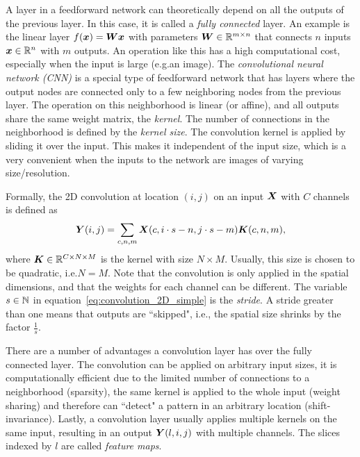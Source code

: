 		A layer in a feedforward network can theoretically depend on all the outputs of the previous layer.
		In this case, it is called a \emph{fully connected} layer.
		An example is the linear layer $f(\bm{x}) = \bm{W} \bm{x}$ with parameters $\bm{W} \in \mathbb{R}^{m \times n}$ that connects $n$ inputs $\bm{x} \in \mathbb{R}^n$ with $m$ outputs.
		An operation like this has a high computational cost, especially when the input is large (e.g.\@ an image).
		The \emph{convolutional neural network (CNN)} is a special type of feedforward network that has layers where the output nodes are connected only to a few neighboring nodes from the previous layer.
		The operation on this neighborhood is linear (or affine), and all outputs share the same weight matrix, the \emph{kernel}.
		The number of connections in the neighborhood is defined by the \emph{kernel size}.
		The convolution kernel is applied by sliding it over the input.
		This makes it independent of the input size, which is a very convenient when the inputs to the network are images of varying size/resolution.
		
		Formally, the 2D convolution at location $(i, j)$ on an input $\bm{X}$ with $C$ channels is defined as 
		\begin{equation}\label{eq:convolution_2D_simple}
			\bm{Y}(i, j) = 
			\sum_{c, n, m}
				\bm{X}(c, i \cdot s - n, j \cdot s - m) \bm{K}(c, n, m), 
		\end{equation}
		where $\bm{K} \in \mathbb{R}^{C \times N \times M}$ is the kernel with size $N \times M$.
		Usually, this size is chosen to be quadratic, i.e.\@ $N = M$.
		Note that the convolution is only applied in the spatial dimensions, and that the weights for each channel can be different.
		The variable $s \in \mathbb{N}$ in equation~\ref{eq:convolution_2D_simple} is the \emph{stride}.
		A stride greater than one means that outputs are ``skipped", i.e., the spatial size shrinks by the factor $\frac{1}{s}$.
		
		There are a number of advantages a convolution layer has over the fully connected layer.
		The convolution can be applied on arbitrary input sizes, it is computationally efficient due to the limited number of connections to a neighborhood (sparsity), the same kernel is applied to the whole input (weight sharing) and therefore can ``detect" a pattern in an arbitrary location (shift-invariance).
		Lastly, a convolution layer usually applies multiple kernels on the same input, resulting in an output $\bm{Y}(l, i, j)$ with multiple channels.
		The slices indexed by $l$ are called \emph{feature maps}.
		
